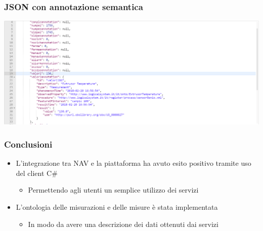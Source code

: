\documentclass{beamer}
\begin{document}
\begin{frame}
\frametitle{JSON con annotazione semantica}
\includegraphics[width=1\textwidth]{images/JSONRestituito.png}
\end{frame}


\begin{frame}
\frametitle{Conclusioni}
\begin{itemize}
\item L'integrazione tra NAV e la piattaforma ha avuto esito positivo tramite uso del client C\# 
\begin{itemize}
\item Permettendo agli utenti un semplice utilizzo dei servizi
\end{itemize}
\item L'ontologia delle misurazioni e delle misure è stata implementata
\begin{itemize}
\item In modo da avere una descrizione dei dati ottenuti dai servizi
\end{itemize}

\end{itemize}	
\end{frame}
\end{document}
